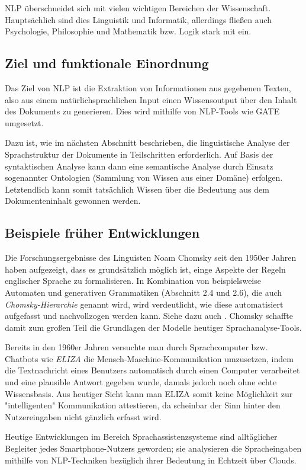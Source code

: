 \documentclass[12pt]{report}
\begin{document}
NLP überschneidet sich mit vielen wichtigen Bereichen der Wissenschaft. Hauptsächlich sind dies Linguistik und Informatik, allerdings fließen auch Psychologie, Philosophie und Mathematik bzw. Logik stark mit ein. 

\subsection{Ziel und funktionale Einordnung}
Das Ziel von NLP ist die Extraktion von Informationen aus gegebenen Texten, also aus einem natürlichsprachlichen Input einen Wissensoutput über den Inhalt des Dokuments zu generieren. Dies wird mithilfe von NLP-Tools wie GATE umgesetzt.

Dazu ist, wie im nächsten Abschnitt beschrieben, die linguistische Analyse der Sprachstruktur der Dokumente in Teilschritten erforderlich. Auf Basis der syntaktischen Analyse kann dann eine semantische Analyse durch Einsatz sogenannter Ontologien (Sammlung von Wissen aus einer Domäne) erfolgen. Letztendlich kann somit tatsächlich Wissen über die Bedeutung aus dem Dokumenteninhalt gewonnen werden.

\subsection{Beispiele früher Entwicklungen}
Die Forschungsergebnisse des Linguisten Noam Chomsky seit den 1950er Jahren haben aufgezeigt, dass es grundsätzlich möglich ist, einge Aspekte der Regeln englischer Sprache zu formalisieren. In Kombination von beispielsweise Automaten und generativen Grammatiken (Abschnitt 2.4 und 2.6), die auch \textit{Chomsky-Hierarchie} genannt wird, wird verdeutlicht, wie diese automatisiert aufgefasst und nachvollzogen werden kann. Siehe dazu auch \cite{cho57}. Chomsky schaffte damit zum großen Teil die Grundlagen der Modelle heutiger Sprachanalyse-Tools.

Bereits in den 1960er Jahren versuchte man durch Sprachcomputer bzw. Chatbots wie \textit{ELIZA} \cite{wei66} die Mensch-Maschine-Kommunikation umzusetzen, indem die Textnachricht eines Benutzers automatisch durch einen Computer verarbeitet und eine plausible Antwort gegeben wurde, damals jedoch noch ohne echte Wissensbasis. Aus heutiger Sicht kann man ELIZA somit keine Möglichkeit zur "intelligenten" Kommunikation attestieren, da scheinbar der Sinn hinter den Nutzereingaben nicht gänzlich erfasst wird.

Heutige Entwicklungen im Bereich Sprachassistenzsysteme sind alltäglicher Begleiter jedes Smartphone-Nutzers geworden; sie analysieren die Spracheingaben mithilfe von NLP-Techniken bezüglich ihrer Bedeutung in Echtzeit über Clouds. \cite{hao14}
\end{document}
